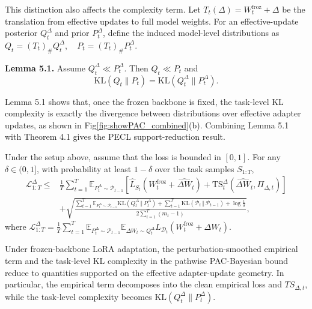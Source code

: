 \documentclass{article}
\begin{document}
This distinction also affects the complexity term. Let $T_t(\Delta)=W_t^{\mathrm{froz}}+\Delta$ be the translation from effective updates to full model weights. For an effective-update posterior $Q_t^\Delta$ and prior $P_t^\Delta$, define the induced model-level distributions as
$
Q_t=(T_t)_\# Q_t^\Delta,
\quad
P_t=(T_t)_\# P_t^\Delta.
$

\textbf{Lemma 5.1.}
Assume $Q_t^\Delta\ll P_t^\Delta$. Then $Q_t\ll P_t$ and
$$
\mathrm{KL}(Q_t\|P_t)
=
\mathrm{KL}(Q_t^\Delta\|P_t^\Delta).
$$

Lemma 5.1 shows that, once the frozen backbone is fixed, the task-level KL complexity is exactly the divergence between distributions over effective adapter updates, as shown in Fig\ref{fig:showPAC_combined}(b).
Combining Lemma 5.1 with Theorem 4.1 gives the PECL support-reduction result.

\begin{theorem}
\label{thm:pecl-bound}
Under the setup above, assume that the loss is bounded in $[0,1]$.
For any $\delta\in(0,1]$, with probability at least $1-\delta$ over the task samples $S_{1:T}$,
$$
\begin{aligned}
\mathcal L_{1:T}^{\Delta}
\le
&
\frac{1}{T}
\sum_{t=1}^{T}
\mathbb E_{P_t^\Delta\sim\mathcal P_{t-1}}
\left[
\widehat L_{S_t}
\left(
W_t^{\mathrm{froz}}
+
\widehat{\Delta W}_t
\right)
+
\mathrm{TS}_t^\Delta
\left(
\widehat{\Delta W}_t,
\Pi_{\Delta,t}
\right)
\right]
\\
&+
\sqrt{
\frac{
\sum_{t=1}^{T}
\mathbb E_{P_t^\Delta\sim \mathcal P_{t-1}}
\mathrm{KL}
\left(
Q_t^\Delta
\,\Vert\,
P_t^\Delta
\right)
+
\sum_{t=1}^{T}
\mathrm{KL}
\left(
\mathcal P_t
\,\Vert\,
\mathcal P_{t-1}
\right)
+
\log \frac{1}{\delta}
}{
2\sum_{t=1}^{T}(m_t-1)
}
},
\end{aligned}
$$
where
$
\mathcal L_{1:T}^{\Delta}
=
\frac{1}{T}
\sum_{t=1}^{T}
\mathbb E_{P_t^\Delta\sim\mathcal P_{t-1}}
\mathbb E_{\Delta W_t\sim Q_t^\Delta}
L_{\mathcal D_t}
\left(
W_t^{\mathrm{froz}}
+
\Delta W_t
\right).
$
\end{theorem}



Under frozen-backbone LoRA adaptation, the perturbation-smoothed empirical term and the task-level KL complexity in the pathwise PAC-Bayesian bound reduce to quantities supported on the effective adapter-update geometry. In particular, the empirical term decomposes into the clean empirical loss and $TS_{\Delta,t}$, while the task-level complexity becomes $\mathrm{KL}(Q_t^\Delta\|P_t^\Delta)$.
\end{document}
